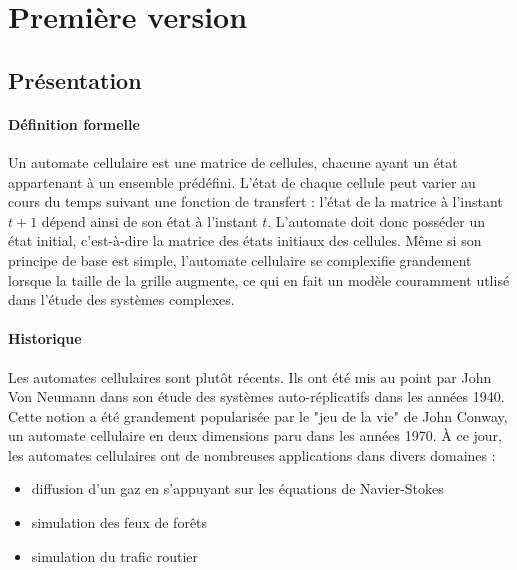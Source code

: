 \documentclass{article}
\begin{document}
\section{Première version}

\subsection{Présentation}
\paragraph{Définition formelle\\[0.2cm]}
	Un automate cellulaire est une matrice de cellules, chacune ayant un état appartenant à un ensemble prédéfini. L'état de chaque cellule peut varier au cours du temps suivant une fonction de transfert : l'état de la matrice à l'instant $t+1$ dépend ainsi de son état à l'instant $t$. L'automate doit donc posséder un état initial, c'est-à-dire la matrice des états initiaux des cellules. Même si son principe de base est simple, l'automate cellulaire se complexifie grandement lorsque la taille de la grille augmente, ce qui en fait un modèle couramment utlisé dans l'étude des systèmes complexes.

\paragraph{Historique\\[0.2cm]}
	Les automates cellulaires sont plutôt récents. Ils ont été mis au point par John Von Neumann dans son étude des systèmes auto-réplicatifs dans les années 1940. Cette notion a été grandement popularisée par le "jeu de la vie" de John Conway, un automate cellulaire en deux dimensions paru dans les années 1970. À ce jour, les automates cellulaires ont de nombreuses applications dans divers domaines :
	\begin{itemize}
	\item diffusion d'un gaz en s'appuyant sur les équations de Navier-Stokes
	\item simulation des feux de forêts
	\item simulation du trafic routier
	\end{itemize}
\end{document}
